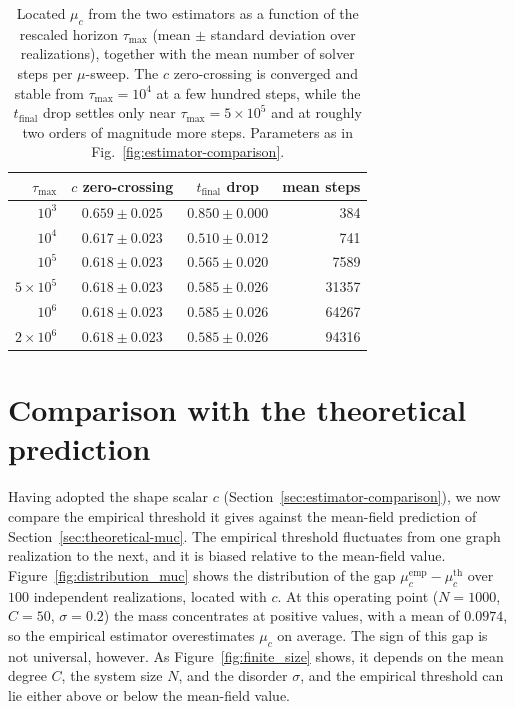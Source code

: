 \begin{table}[h]
    \centering
    \begin{tabular}{rccr}
        \hline
        $\tau_{\max}$ & $c$ zero-crossing & $t_{\mathrm{final}}$ drop & mean steps \\
        \hline
        $10^3$         & $0.659 \pm 0.025$ & $0.850 \pm 0.000$ &    384 \\
        $10^4$         & $0.617 \pm 0.023$ & $0.510 \pm 0.012$ &    741 \\
        $10^5$         & $0.618 \pm 0.023$ & $0.565 \pm 0.020$ &   7589 \\
        $5\times10^5$  & $0.618 \pm 0.023$ & $0.585 \pm 0.026$ &  31357 \\
        $10^6$         & $0.618 \pm 0.023$ & $0.585 \pm 0.026$ &  64267 \\
        $2\times10^6$  & $0.618 \pm 0.023$ & $0.585 \pm 0.026$ &  94316 \\
        \hline
    \end{tabular}
    \caption{Located $\mu_c$ from the two estimators as a function of the rescaled
    horizon $\tau_{\max}$ (mean $\pm$ standard deviation over realizations),
    together with the mean number of solver steps per $\mu$-sweep. The $c$
    zero-crossing is converged and stable from $\tau_{\max} = 10^4$ at a few
    hundred steps, while the $t_{\mathrm{final}}$ drop settles only near
    $\tau_{\max} = 5\times10^5$ and at roughly two orders of magnitude more steps.
    Parameters as in Fig.~\ref{fig:estimator-comparison}.}
    \label{tab:estimator-comparison}
\end{table}

\FloatBarrier

\section{Comparison with the theoretical prediction}
\label{sec:muc-statistics}

Having adopted the shape scalar $c$ (Section~\ref{sec:estimator-comparison}), we now
compare the empirical threshold it gives against the mean-field prediction of
Section~\ref{sec:theoretical-muc}. The empirical threshold fluctuates from one graph
realization to the next, and it is biased relative to the mean-field value.
Figure~\ref{fig:distribution_muc} shows the distribution of the gap
$\mu_c^{\mathrm{emp}} - \mu_c^{\mathrm{th}}$ over $100$ independent realizations,
located with $c$. At this operating point ($N = 1000$, $C = 50$, $\sigma = 0.2$) the
mass concentrates at positive values, with a mean of $0.0974$, so the empirical
estimator overestimates $\mu_c$ on average. The sign of this gap is not universal,
however. As Figure~\ref{fig:finite_size} shows, it depends on the mean degree $C$,
the system size $N$, and the disorder $\sigma$, and the empirical threshold can lie
either above or below the mean-field value.

